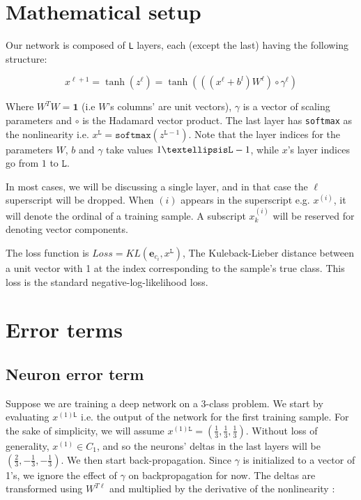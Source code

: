 \documentclass[]{article}
\begin{document}
 	\section{Mathematical setup}
 		Our network is composed of \texttt{L} layers, each (except the last) having the following structure:
 		
 		$$x^{\ell+1} = \tanh(z^\ell) = \tanh(((x^\ell+b^l)W^\ell)\circ \gamma^\ell)$$
 		
 		Where $W^T W=\mathbf{1}$ (i.e $W$'s columns' are unit vectors), $\gamma$ is a vector of scaling parameters and $\circ$ is the Hadamard vector product. The last layer has \texttt{softmax} as the nonlinearity i.e. 
 		$x^\mathtt{L} = \mathtt{softmax}(z^{\mathtt{L}-1})$. 
 		Note that the layer indices for the parameters $W$, $b$ and $\gamma$ take values $1\textellipsis\mathtt{L} -1$, while $x$'s layer indices go from $1$ to $\mathtt{L}$.
 		
 		In most cases, we will be discussing a single layer, and in that case the $\ell$ superscript will be dropped. When $(i)$ appears in the superscript e.g. $x^{(i)}$, it will denote the ordinal of a training sample. A subscript $x^{(i)}_k$ will be reserved for denoting vector components.
 		
 		
 		The loss function is $Loss=KL(\mathbf{e}_{c_i},x^\mathtt{L})$, The Kuleback-Lieber distance between a unit vector with 1 at the index corresponding to the sample's true class. This loss is the standard negative-log-likelihood loss.
 		
 		
 	\section{Error terms}
 	\subsection{Neuron error term}
 		Suppose we are training a deep network on a 3-class problem. We start by evaluating $x^{(1)\textsf{L} }$ i.e. the output of the network for the first training sample. For the sake of simplicity, we will assume $x^{(1)\mathtt{L} } = \left(\frac{1}{3},\frac{1}{3},\frac{1}{3}\right)$. Without loss of generality, $x^{(1)} \in C_1$, and so the neurons' deltas in the last layers will be  $\left(\frac{2}{3},-\frac{1}{3},-\frac{1}{3}\right)$.
 		We then start back-propagation. Since $\gamma$ is initialized to a vector of 1's, we ignore the effect of $\gamma$ on backpropagation for now. The deltas are transformed using $W^{T\ell}$ and multiplied by the derivative of the nonlinearity :
 		
\end{document}
